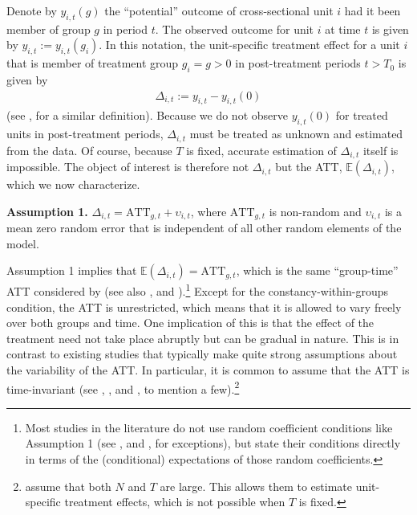 \documentclass[12pt,fleqn]{article}
\begin{document}
  Denote by $y_{i,t}(g)$ the ``potential'' outcome of cross-sectional unit $i$ had it been member of group $g$ in period $t$. The observed outcome for unit $i$ at time $t$ is given by $y_{i,t} := y_{i,t}(g_i)$. In this notation, the unit-specific treatment effect for a unit $i$ that is member of treatment group $g_i = g > 0$ in post-treatment periods $t > T_0$ is given by
  \begin{align}
  \Delta_{i,t} := y_{i,t} - y_{i,t}(0) \label{te}
  \end{align}
  (see \citealp{borusyak2021revisiting}, for a similar definition). Because we do not observe $y_{i,t}(0)$ for treated units in post-treatment periods, $\Delta_{i,t}$ must be treated as unknown and estimated from the data. Of course, because $T$ is fixed, accurate estimation of $\Delta_{i,t}$ itself is impossible. The object of interest is therefore not $\Delta_{i,t}$ but the ATT, $\mathbb{E}(\Delta_{i,t})$, which we now characterize.
  
  \bigskip
  
  \noindent \textbf{Assumption 1.} $\Delta_{i,t} = \mathrm{ATT}_{g,t} + \upsilon_{i,t}$, where $\mathrm{ATT}_{g,t}$ is non-random and $\upsilon_{i,t}$ is a mean zero random error that is independent of all other random elements of the model.
  
  \bigskip
  
  Assumption 1 implies that $\mathbb{E}(\Delta_{i,t} ) = \mathrm{ATT}_{g,t}$, which is the same ``group-time'' ATT considered by \citet{Callaway_SantAnna_2020} (see also \citealp{Callaway_Karami_2020}, and \citealp{Xu_2017}).\footnote{Most studies in the literature do not use random coefficient conditions like Assumption 1 (see \citealp{chan2022pcdid}, and \citealp{Gobillon_Magnac_2016}, for exceptions), but state their conditions directly in terms of the (conditional) expectations of those random coefficients.} Except for the constancy-within-groups condition, the ATT is unrestricted, which means that it is allowed to vary freely over both groups and time. One implication of this is that the effect of the treatment need not take place abruptly but can be gradual in nature. This is in contrast to existing studies that typically make quite strong assumptions about the variability of the ATT. In particular, it is common to assume that the ATT is time-invariant (see \citealp{Abadie_2005}, \citealp{chan2022pcdid}, and \citealp{Gobillon_Magnac_2016}, to mention a few).\footnote{\citet{chan2022pcdid} assume that both $N$ and $T$ are large. This allows them to estimate unit-specific treatment effects, which is not possible when $T$ is fixed.}
  
\end{document}
